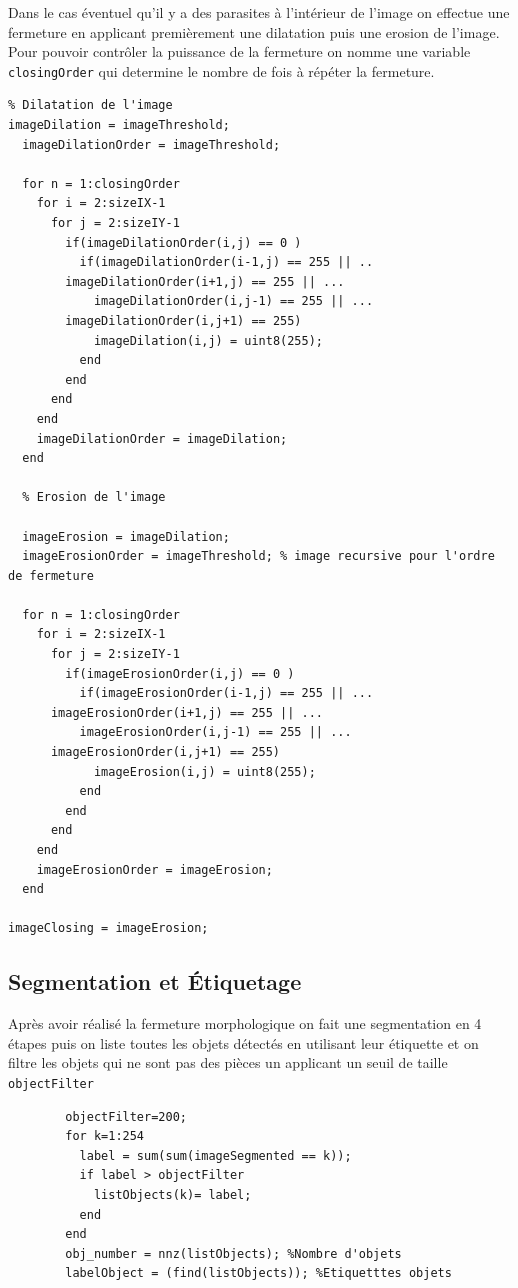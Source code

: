 \documentclass[11pt, openright]{book}
\begin{document}
			Dans le cas éventuel qu'il y a des parasites à l'intérieur de l'image on effectue une fermeture 
			en applicant premièrement une dilatation puis une erosion de l'image. Pour pouvoir contrôler la puissance de la fermeture on nomme une variable \texttt{closingOrder} qui determine le nombre de fois à répéter la fermeture.
			\begin{lstlisting}
% Dilatation de l'image
imageDilation = imageThreshold;
  imageDilationOrder = imageThreshold;

  for n = 1:closingOrder
    for i = 2:sizeIX-1
      for j = 2:sizeIY-1
        if(imageDilationOrder(i,j) == 0 )
          if(imageDilationOrder(i-1,j) == 255 || ..
  	    imageDilationOrder(i+1,j) == 255 || ...
            imageDilationOrder(i,j-1) == 255 || ...
	    imageDilationOrder(i,j+1) == 255)
            imageDilation(i,j) = uint8(255);
          end
        end
      end
    end
    imageDilationOrder = imageDilation;
  end

  % Erosion de l'image

  imageErosion = imageDilation;
  imageErosionOrder = imageThreshold; % image recursive pour l'ordre de fermeture

  for n = 1:closingOrder
    for i = 2:sizeIX-1
      for j = 2:sizeIY-1
        if(imageErosionOrder(i,j) == 0 )
          if(imageErosionOrder(i-1,j) == 255 || ...
  	  imageErosionOrder(i+1,j) == 255 || ...
          imageErosionOrder(i,j-1) == 255 || ...
  	  imageErosionOrder(i,j+1) == 255)
            imageErosion(i,j) = uint8(255);
          end
        end
      end
    end
    imageErosionOrder = imageErosion;
  end

imageClosing = imageErosion;
			\end{lstlisting}

		\subsection{Segmentation et Étiquetage}
			
			Après avoir réalisé la fermeture morphologique on fait une segmentation en 4 étapes puis on liste toutes les objets détectés en utilisant leur étiquette  et on filtre les objets qui ne sont pas des pièces un applicant un seuil de taille \texttt{objectFilter}
			\begin{lstlisting}
		objectFilter=200;
		for k=1:254
		  label = sum(sum(imageSegmented == k));
  		  if label > objectFilter
  		    listObjects(k)= label;
  		  end
		end
		obj_number = nnz(listObjects); %Nombre d'objets
		labelObject = (find(listObjects)); %Etiquetttes objets
			\end{lstlisting}
\end{document}
